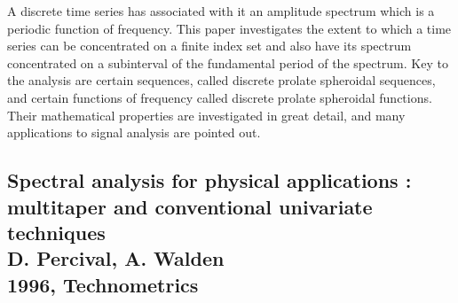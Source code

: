 \documentclass{article}
\begin{document}
A discrete time series has associated with it an amplitude spectrum which is a periodic function of frequency. This paper investigates the extent to which a time series can be concentrated on a finite index set and also have its spectrum concentrated on a subinterval of the fundamental period of the spectrum. Key to the analysis are certain sequences, called discrete prolate spheroidal sequences, and certain functions of frequency called discrete prolate spheroidal functions. Their mathematical properties are investigated in great detail, and many applications to signal analysis are pointed out.

\subsection{Spectral analysis for physical applications : multitaper and conventional univariate techniques \\
D. Percival, A. Walden \\
1996, Technometrics}
\\
\end{document}
